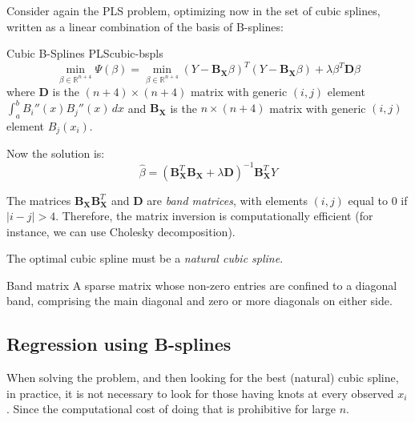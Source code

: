 Consider again the PLS problem, optimizing now in the set of cubic splines, written
as a linear combination of the basis of B-splines:
\begin{problem}{Cubic B-Splines PLS}{cubic-bspls}
    \begin{equation*}
        \min_{\beta \in \mathds R^{n+4}} \Psi(\beta) = \min_{\beta \in \mathds R^{n+4}}
        \left( Y - \boldsymbol B_{\boldsymbol X} \beta \right)^T
        \left( Y - \boldsymbol B_{\boldsymbol X} \beta \right)
        + \lambda \beta^T \boldsymbol D \beta
    \end{equation*}
    where $\boldsymbol D$ is the $(n+4)\times(n+4)$ matrix with generic $(i,j)$
    element $\int_a^b B_i''(x)B_j''(x)\,dx$ and $\boldsymbol B_{\boldsymbol X}$ is
    the $n \times (n+4)$ matrix with generic $(i,j)$ element $B_j(x_i)$.

    Now the solution is:
    \begin{equation*}
        \hat \beta = \left( \boldsymbol B_{\boldsymbol X}^T \boldsymbol B_{\boldsymbol X}
            + \lambda \boldsymbol D \right)^{-1} \boldsymbol B_{\boldsymbol X}^T Y
    \end{equation*}
    \tcblower
    \begin{note}
        The matrices $\boldsymbol B_{\boldsymbol X}\boldsymbol B_{\boldsymbol X}^T$ and
        $\boldsymbol D$ are \emph{band matrices}, with elements $(i,j)$ equal to 0 if
        $|i-j| > 4$. Therefore, the matrix inversion is computationally efficient
        (for instance, we can use Cholesky decomposition).
    \end{note}
    \begin{note}
        The optimal cubic spline must be a \emph{natural cubic spline}.
    \end{note}
\end{problem}

\begin{definition}{Band matrix}{}
    A sparse matrix whose non-zero entries are confined to a diagonal band,
    comprising the main diagonal and zero or more diagonals on either side.
\end{definition}

\subsection{Regression using B-splines}

When solving the  problem, and then looking for
the best (natural) cubic spline, in practice, it is not necessary to look
for those having knots at every observed $x_i$. Since the computational
cost of doing that is prohibitive for large $n$.

